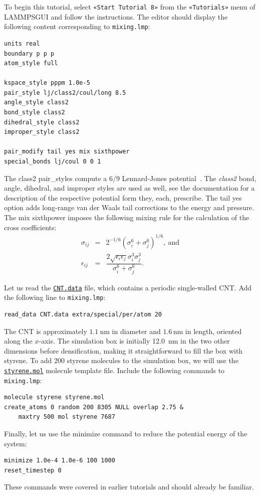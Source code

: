 \documentclass[9pt,tutorial]{livecoms}
\newcommand{\lmpcmd}[1]{\colorbox{listing}{\textcolor{command}{\small{#1}}}} %
\newcommand{\flecmd}[1]{\textcolor{command}{\texttt{#1}}} %
\newcommand{\guicmd}[1]{\textcolor{command}{\texttt{«#1»}}} %
\newcommand{\dwlcmd}[1]{\textcolor{download}{\texttt{#1}}} %
\newcommand{\lammpsgui}{\textsf{LAMMPS\textendash GUI}}
\newcommand{\filepath}{https://raw.githubusercontent.com/lammpstutorials/lammpstutorials-article/main/files/}
\begin{document}
To begin this tutorial, select \guicmd{Start Tutorial 8} from the
\guicmd{Tutorials} menu of \lammpsgui{} and follow the instructions.
The editor should display the following content corresponding to \flecmd{mixing.lmp}:
\begin{lstlisting}
units real
boundary p p p
atom_style full

kspace_style pppm 1.0e-5
pair_style lj/class2/coul/long 8.5
angle_style class2
bond_style class2
dihedral_style class2
improper_style class2

pair_modify tail yes mix sixthpower
special_bonds lj/coul 0 0 1
\end{lstlisting}
The \lmpcmd{class2} \lmpcmd{pair_styles} compute a 6/9 Lennard-Jones potential~\cite{sun1998compass}.
The \textit{class2} bond, angle, dihedral, and improper styles are used as
well, see the documentation for a description of the respective potential
form they, each, prescribe.
The \lmpcmd{tail yes} option adds long-range van der Waals tail
corrections to the energy and pressure.
The \lmpcmd{mix sixthpower} imposes the following mixing rule for the calculation
of the cross coefficients:
\begin{eqnarray}
\nonumber
\sigma_{ij} & = & 2^{-1/6} (\sigma^6_i+\sigma_j^6)^{1/6}, ~ \text{and} \\
\nonumber
\epsilon_{ij} & = & \dfrac{2 \sqrt{\epsilon_i \epsilon_j} \sigma^3_i \sigma^3_j}{\sigma^6_i+\sigma_j^6}.
\end{eqnarray}

Let us read the \href{\filepath tutorial8/CNT.data}{\dwlcmd{CNT.data}} file, which
contains a periodic single-walled CNT.  Add the following line to \flecmd{mixing.lmp}:
\begin{lstlisting}
read_data CNT.data extra/special/per/atom 20
\end{lstlisting}
The CNT is approximately $1.1~\text{nm}$ in diameter and $1.6\,\text{nm}$ in length, oriented
along the $x$-axis. The simulation box is initially 12.0~nm in the two other dimensions before densification,
making it straightforward to fill the box with styrene.
To add 200 styrene molecules to the simulation box, we will use the
\href{\filepath tutorial8/styrene.mol}{\dwlcmd{styrene.mol}} molecule template file.
Include the following commands to \flecmd{mixing.lmp}:
\begin{lstlisting}
molecule styrene styrene.mol
create_atoms 0 random 200 8305 NULL overlap 2.75 &
    maxtry 500 mol styrene 7687
\end{lstlisting}
Finally, let us use the \lmpcmd{minimize} command to reduce the potential energy of the system:
\begin{lstlisting}
minimize 1.0e-4 1.0e-6 100 1000
reset_timestep 0
\end{lstlisting}
These commands were covered in earlier tutorials and should already be familiar.
\end{document}
